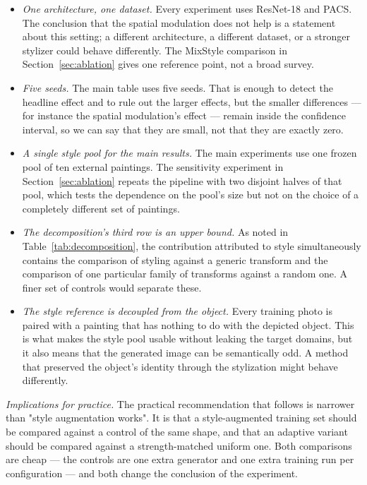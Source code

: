 \begin{itemize}
\item \textit{One architecture, one dataset.} Every experiment uses ResNet-18 and PACS. The conclusion that the spatial modulation does not help is a statement about this setting; a different architecture, a different dataset, or a stronger stylizer could behave differently. The MixStyle comparison in Section~\ref{sec:ablation} gives one reference point, not a broad survey.
\item \textit{Five seeds.} The main table uses five seeds. That is enough to detect the headline effect and to rule out the larger effects, but the smaller differences --- for instance the spatial modulation's effect --- remain inside the confidence interval, so we can say that they are small, not that they are exactly zero.
\item \textit{A single style pool for the main results.} The main experiments use one frozen pool of ten external paintings. The sensitivity experiment in Section~\ref{sec:ablation} repeats the pipeline with two disjoint halves of that pool, which tests the dependence on the pool's size but not on the choice of a completely different set of paintings.
\item \textit{The decomposition's third row is an upper bound.} As noted in Table~\ref{tab:decomposition}, the contribution attributed to style simultaneously contains the comparison of styling against a generic transform and the comparison of one particular family of transforms against a random one. A finer set of controls would separate these.
\item \textit{The style reference is decoupled from the object.} Every training photo is paired with a painting that has nothing to do with the depicted object. This is what makes the style pool usable without leaking the target domains, but it also means that the generated image can be semantically odd. A method that preserved the object's identity through the stylization might behave differently.
\end{itemize}

\textit{Implications for practice.} The practical recommendation that follows is narrower than "style augmentation works". It is that a style-augmented training set should be compared against a control of the same shape, and that an adaptive variant should be compared against a strength-matched uniform one. Both comparisons are cheap --- the controls are one extra generator and one extra training run per configuration --- and both change the conclusion of the experiment.
